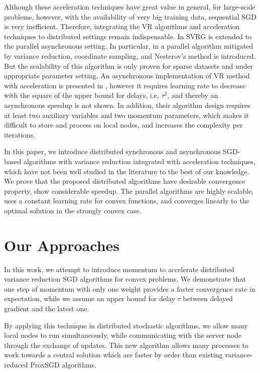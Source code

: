 Although these acceleration techniques have great value in general, for large-scale problems, however, with the availability of very big training data, sequential SGD is very inefficient. Therefore, integrating the VR algorithms and acceleration techniques to distributed settings remain indispensable. In \cite{Reddi2015,Mania2017} SVRG is extended to the parallel asynchronous setting. In particular, in \cite{Meng2016} a parallel algorithm mitigated by variance reduction, coordinate sampling, and Nesterov’s method is introduced. But the scalability of this algorithm is only proven for sparse datasets and under appropriate parameter setting. An asynchronous implementation of VR method with acceleration is presented in \cite{fang2018accelerating}, however it requires learning rate to decrease with the square  of the upper bound for delays, i.e. $\tau^2$, and thereby an asynchronous speedup is not shown. In addition, their algorithm design requires at least two auxiliary variables
and two momentum parameters, which makes it difficult to store and process on local nodes, and increases the  complexity per iterations. 


In this paper, we introduce distributed synchronous and asynchronous SGD-based algorithms with variance reduction integrated with acceleration techniques, which have not been well studied in the literature to the best of our knowledge. We prove that the proposed distributed algorithms have desirable convergence property, show considerable speedup. The parallel algorithms are highly scalable, uses a constant learning rate for convex functions, and converges linearly to the optimal solution in the strongly convex case.

\section{Our Approaches}
In this work, we attempt to introduce momentum to accelerate distributed variance reduction SGD algorithms for convex problems. We demonstrate that one step of momentum with only one weight provides a faster convergence rate in expectation, while we assume an upper bound for delay $\tau$ between delayed gradient and the latest one. 

By applying this technique in distributed stochastic algorithms, we allow many local nodes to run simultaneously, while communicating 
with the server node through the exchange of updates. This new algorithm allows many processes to work towards a central solution which are
faster by order than existing variance-reduced ProxSGD algorithms. 

